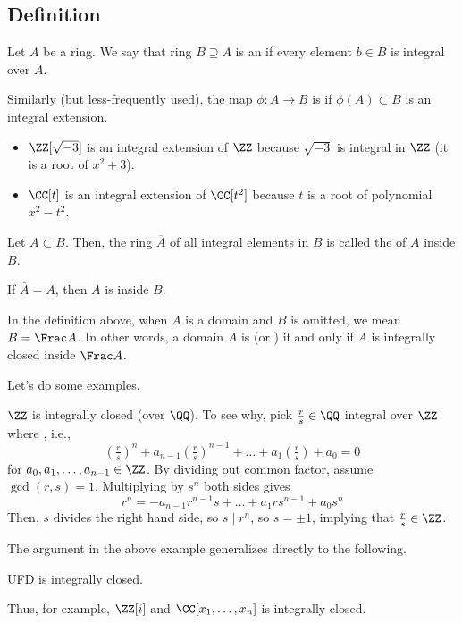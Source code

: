 \subsection{Definition}
\begin{definition}
    Let $A$ be a ring. We say that ring $B\supseteq A$
    is an 
    if every element $b\in B$
    is integral over $A$.

    Similarly (but less-frequently used),
    the map $\phi : A\to B$ is 
    if $\phi(A)\subset B$ is an integral extension.
\end{definition}
\begin{example}
    \begin{itemize}
    \item $\ZZ[\sqrt{-3}]$ is an integral extension of $\ZZ$
    because $\sqrt{-3}$ is integral in $\ZZ$
    (it is a root of $x^2+3$).
    \item $\CC[t]$ is an integral extension of $\CC[t^2]$
    because $t$ is a root of polynomial $x^2-t^2$.
    \end{itemize}
\end{example}
\begin{definition}
    Let $A\subset B$. Then, the ring $\overline A$ of all
    integral elements in $B$ is called the
     of $A$ inside $B$.

    If $\overline A=A$, then $A$ is  inside $B$.

    In the definition above,
    when $A$ is a domain and $B$ is omitted,
    we mean $B=\Frac A$.
    In other words, a domain $A$ is 
    (or )
    if and only if $A$ is integrally closed inside
    $\Frac A$. 
\end{definition}
Let's do some examples.
\begin{example}
    $\ZZ$ is integrally closed (over $\QQ$). To see why,
    pick $\tfrac rs\in\QQ$ integral over $\ZZ$ where , i.e.,
    $$\left(\tfrac rs\right)^n + a_{n-1}\left(\tfrac rs\right)^{n-1} + \dots + a_1\left(\tfrac rs\right)
    + a_0 = 0$$
    for $a_0,a_1,\dots,a_{n-1}\in\ZZ$. 
    By dividing out common factor, assume $\gcd(r,s)=1$.
    Multiplying by $s^n$ both sides gives
    $$r^n =  - a_{n-1}r^{n-1}s + \dots + a_1rs^{n-1}
    + a_0s^n$$
    Then, $s$ divides the right hand side, so $s\mid r^n$,
    so $s=\pm 1$, implying that $\tfrac rs\in\ZZ$.
\end{example}
The argument in the above example generalizes directly to the following.
\begin{proposition}
    \label{prop:ufd_integrally_closed}
    UFD is integrally closed.
\end{proposition}
Thus, for example, $\ZZ[i]$ and 
$\CC[x_1,\dots,x_n]$ is integrally closed.

